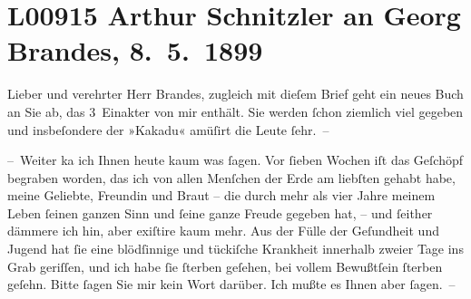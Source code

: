 

\section[Arthur Schnitzler an Georg Brandes, 8. 5. 1899]{L00915 Arthur Schnitzler an Georg Brandes, 8. 5. 1899}
\nopagebreak{}
\rehead{ }\normalsize\beginnumbering{}
\toendnotes[C]{\smallbreak\pagebreak[2]}
\toendnotes[C]{\smallbreak}
\pstart{}{\pb}Lieber und verehrter Herr Brandes,\pend\vspace{0.5em}
\pstart
           zugleich mit dieſem Brief geht ein neues Buch an Sie ab, das 3 Einakter von mir enthält. Sie werden
               ſchon ziemlich viel gegeben und insbeſondere der »Kakadu« amüſirt die Leute ſehr. –\pend
           
\pstart
           – Weiter ka{\geminationn} ich Ihnen heute kaum was ſagen. Vor ſieben
               Wochen iſt das Geſchöpf
               begraben worden, das ich von allen {\pb}Menſchen der
               Erde am liebſten gehabt habe, meine Geliebte, Freundin und Braut – die durch mehr als
               vier Jahre meinem Leben ſeinen ganzen Sinn und ſeine ganze Freude gegeben hat, – und
               ſeither dämmere ich hin, aber exiſtire kaum mehr. Aus der Fülle der Geſundheit und
               Jugend hat ſie eine blödſinnige und tückiſche Krankheit innerhalb zweier Tage ins
               Grab geriſſen, und ich habe ſie ſterben geſehen, bei vollem Bewußt{\pb}ſein ſterben geſehn. Bitte ſagen Sie mir kein Wort
               darüber. Ich mußte es Ihnen aber ſagen. –\pend
           
